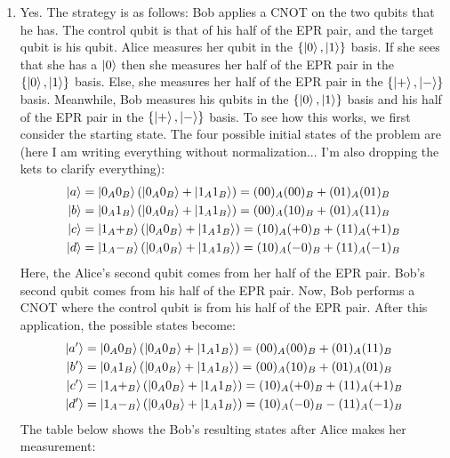 \documentclass{article}
\theoremstyle{definition}
\begin{document}
\begin{enumerate}[label=(\alph*)]
	\item Yes. The strategy is as follows: Bob applies a CNOT on the two qubits that he has. The control qubit is that of his half of the EPR pair, and the target qubit is his qubit. Alice measures her qubit in the $\{\ket{0}, \ket{1}\}$ basis. If she sees that she has a $\ket{0}$ then she measures her half of the EPR pair in the $\{\ket{0}, \ket{1}\}$ basis. Else, she measures her half of the EPR pair in the $\{ \ket{+}, \ket{-} \}$ basis. Meanwhile, Bob measures his qubits in the $\{ \ket{0}, \ket{1}   \}$ basis and his half of the EPR pair in the $\{ \ket{+}, \ket{-}  \}$ basis. To see how this works, we first consider the starting state. The four possible initial states of the problem are (here I am writing everything without normalization... I'm also dropping the kets to clarify everything):
	\begin{align*}
		\ket{a}	&= \ket{0_A0_B} (\ket{0_A0_B} + \ket{1_A 1_B}) =  (00)_A (00)_B + (01)_A (01)_B \\
		\ket{b} &= \ket{0_A1_B} (\ket{0_A0_B} + \ket{1_A 1_B}) =  (00)_A (10)_B + (01)_A (11)_B \\
		\ket{c} &= \ket{1_A+_B} (\ket{0_A0_B} + \ket{1_A 1_B}) =  (10)_A (+0)_B + (11)_A (+1)_B  \\
		\ket{d} &= \ket{1_A-_B} (\ket{0_A0_B} + \ket{1_A 1_B}) =  (10)_A (-0)_B + (11)_A (-1)_B 
	\end{align*}
	Here, the Alice's second qubit comes from her half of the EPR pair. Bob's second qubit comes from his half of the EPR pair. Now, Bob performs a CNOT where the control qubit is from his half of the EPR pair. After this application, the possible states become:
	\begin{align*}
		\ket{a'} &= \ket{0_A0_B} (\ket{0_A0_B} + \ket{1_A 1_B}) =  (00)_A (00)_B + (01)_A (11)_B \\
		\ket{b'} &= \ket{0_A1_B} (\ket{0_A0_B} + \ket{1_A 1_B}) =  (00)_A (10)_B + (01)_A (01)_B \\
		\ket{c'} &= \ket{1_A+_B} (\ket{0_A0_B} + \ket{1_A 1_B}) =  (10)_A (+0)_B + (11)_A (+1)_B  \\
		\ket{d'} &= \ket{1_A-_B} (\ket{0_A0_B} + \ket{1_A 1_B}) =  (10)_A (-0)_B - (11)_A (-1)_B 
	\end{align*}
	The table below shows the Bob's resulting states after Alice makes her measurement:\\
	

\end{enumerate}
\end{document}
